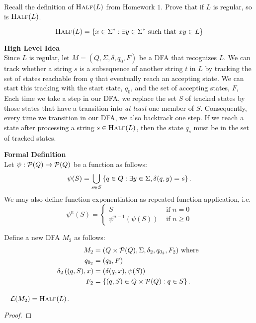 \begin{problem}
  Recall the definition of $\textsc{Half}(L)$ from Homework $1$.
  Prove that if $L$ is regular, so is $\textsc{Half}(L)$.

  \[
    \textsc{Half}(L) = \left\{x \in \Sigma^* : \exists y \in \Sigma^* \text{ such that } x y \in L\right\}
  \]
  \begin{Answer}
    \step
    \textbf{High Level Idea}\\
    Since $L$ is regular, let $M = (Q, \Sigma, \delta, q_0, F)$
    be a DFA that recognizes $L$.
    We can track whether a string $s$ is a subsequence of another
    string $t$ in $L$ by tracking the set of states reachable from $q$
    that eventually reach an accepting state.
    We can start this tracking with the start state, $q_0$,
    and the set of accepting states, $F$,
    Each time we take a step in our DFA, we replace the set $S$ of tracked states
    by those states that have a transition into \emph{at least} one member of $S$.
    Consequently, every time we transition in our DFA,
    we also backtrack one step.
    If we reach a state after processing a string $s \in \textsc{Half}(L)$,
    then the state $q_s$ must be in the set of tracked states.

    \step
    \textbf{Formal Definition}\\
    Let $\psi : \mathcal{P}(Q) \to \mathcal{P}(Q)$ be a function as follows:
    \[ \psi(S) = \bigcup_{s \in S} \left\{q \in Q : \exists y \in \Sigma, \delta(q, y) = s\right\}.\]
    We may also define function exponentiation as repeated function application,
    i.e.
    \[
      \psi^n(S) = \begin{cases}
        S & \text{ if } n = 0 \\
        \psi^{n-1}(\psi(S)) &\text{ if } n \ge 0
      \end{cases}
    \]
  
    \step
    Define a new DFA $M_2$ as follows:
    \begin{align*}
      M_2 &= (Q \times \mathcal{P}(Q), \Sigma, \delta_2, q_{0_2}, F_2) \text{ where }\\
      q_{0_2} &= (q_0, F) \\
      \delta_2 \left((q, S), x \right) &= \left(\delta(q, x), \psi(S) \right) \\
      F_2 &= \left\{(q, S) \in Q \times \mathcal{P}(Q) : q \in S \right\}.
    \end{align*}

    \begin{claim}~\label{claim:half}
      $\mathcal{L}(M_2) = \textsc{Half}(L)$.
      \begin{proof}


\end{proof}
\end{claim}
\end{Answer}
\end{problem}
